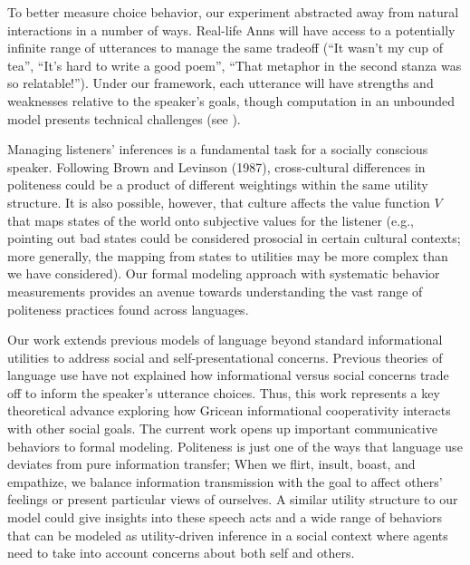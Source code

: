 \documentclass[12pt]{article}
\begin{document}

To better measure choice behavior, our experiment abstracted away from
natural interactions in a number of ways. Real-life Anns will have
access to a potentially infinite range of utterances to manage the same
tradeoff (\enquote{It wasn't my cup of tea}, \enquote{It's hard to write
a good poem}, \enquote{That metaphor in the second stanza was so
relatable!}). Under our framework, each utterance will have strengths
and weaknesses relative to the speaker's goals, though computation in an
unbounded model presents technical challenges (see \cite{goodman2016}).

Managing listeners' inferences is a fundamental task for a socially
conscious speaker. Following Brown and Levinson (1987), cross-cultural
differences in politeness could be a product of different weightings
within the same utility structure. It is also possible, however, that
culture affects the value function \(V\) that maps states of the world
onto subjective values for the listener (e.g., pointing out bad states
could be considered prosocial in certain cultural contexts; more
generally, the mapping from states to utilities may be more complex than
we have considered). Our formal modeling approach with systematic
behavior measurements provides an avenue towards understanding the vast
range of politeness practices found across languages.

Our work extends previous models of language beyond standard
informational utilities to address social and self-presentational
concerns. Previous theories of language use have not explained how
informational versus social concerns trade off to inform the speaker's
utterance choices. Thus, this work represents a key theoretical advance
exploring how Gricean informational cooperativity interacts with other
social goals. The current work opens up important communicative
behaviors to formal modeling. Politeness is just one of the ways that
language use deviates from pure information transfer; When we flirt,
insult, boast, and empathize, we balance information transmission with
the goal to affect others' feelings or present particular views of
ourselves. A similar utility structure to our model could give insights
into these speech acts and a wide range of behaviors that can be modeled
as utility-driven inference in a social context \cite{baker2017rational, hamlin2013mentalistic} 
where agents need to take into account concerns about both self
and others.
\end{document}
